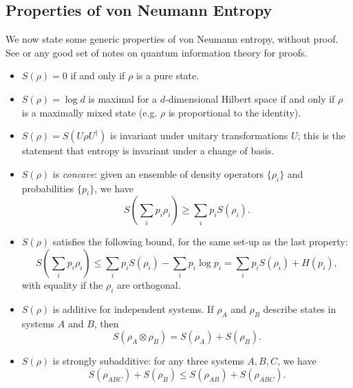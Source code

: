 \documentclass[12pt,a4paper]{report}
\numberwithin{equation}{section}
\theoremstyle{definition}
\theoremstyle{theorem}
\theoremstyle{theorem}
\theoremstyle{example}
\theoremstyle{definition}
\begin{document}
\subsection{Properties of von Neumann Entropy}
We now state some generic properties of von Neumann entropy, without proof. See \cite{NielsenChuang} or any good set of notes on quantum information theory for proofs.
\begin{itemize}
	\item $S(\rho)=0$ if and only if $\rho$ is a pure state.
	\item $S(\rho)=\log{d}$ is maximal for a $d$-dimensional Hilbert space if and only if $\rho$ is a maximally mixed state (e.g. $\rho$ is proportional to the identity).
	\item $S(\rho)=S(U\rho U^{\dagger})$ is invariant under unitary transformations $U$; this is the statement that entropy is invariant under a change of basis.
	\item $S(\rho)$ is \textit{concave}: given an ensemble of density operators $\{\rho_{i}\}$ and probabilities $\{p_{i}\}$, we have
	\begin{equation}
		S\left(\sum_{i}p_{i}\rho_{i}\right)\geq\sum_{i}p_{i}S(\rho_{i}).
	\end{equation}
	\item $S(\rho)$ satisfies the following bound, for the same set-up as the last property:
	\begin{equation}
		S\left(\sum_{i}p_{i}\rho_{i}\right)\leq\sum_{i}p_{i}S(\rho_{i})-\sum_{i}p_{i}\log{p_{i}}=\sum_{i}p_{i}S(\rho_{i})+H(p_{i}),
	\end{equation}
	with equality if the $\rho_{i}$ are orthogonal.
	\item $S(\rho)$ is additive for independent systems. If $\rho_{A}$ and $\rho_{B}$ describe states in systems $A$ and $B$, then
	\begin{equation}
		S(\rho_{A}\otimes\rho_{B})=S(\rho_{A})+S(\rho_{B}).
	\end{equation}
	\item $S(\rho)$ is strongly subadditive: for any three systems $A,B,C$, we have
	\begin{equation}
		S(\rho_{ABC})+S(\rho_{B})\leq S(\rho_{AB})+S(\rho_{ABC}).
	\end{equation}
\end{itemize}
\end{document}

